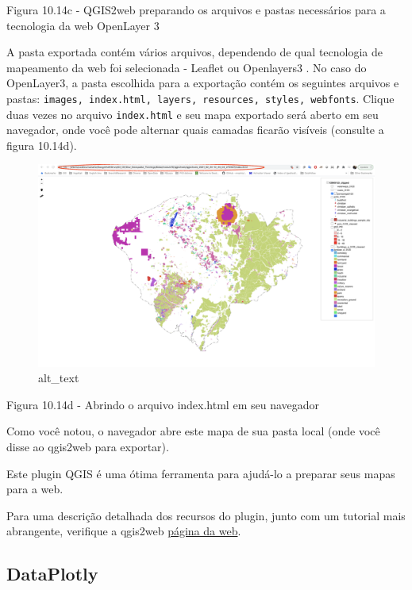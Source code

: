 \documentclass[
  portuguese,
]{krantz}
\begin{document}
Figura 10.14c - QGIS2web preparando os arquivos e pastas necessários para a tecnologia da web OpenLayer 3

A pasta exportada contém vários arquivos, dependendo de qual tecnologia de mapeamento da web foi selecionada - Leaflet ou Openlayers3 . No caso do OpenLayer3, a pasta escolhida para a exportação contém os seguintes arquivos e pastas: \texttt{images,\ index.html,\ layers,\ resources,\ styles,\ webfonts}. Clique duas vezes no arquivo \texttt{index.html} e seu mapa exportado será aberto em seu navegador, onde você pode alternar quais camadas ficarão visíveis (consulte a figura 10.14d).

\begin{figure}
\centering
\includegraphics{media/modulo10/fig1014_d.png}
\caption{alt\_text}
\end{figure}

Figura 10.14d - Abrindo o arquivo index.html em seu navegador

Como você notou, o navegador abre este mapa de sua pasta local (onde você disse ao qgis2web para exportar).

Este plugin QGIS é uma ótima ferramenta para ajudá-lo a preparar seus mapas para a web.

Para uma descrição detalhada dos recursos do plugin, junto com um tutorial mais abrangente, verifique a qgis2web \href{https://github.com/tomchadwin/qgis2web}{página da web}.

\hypertarget{dataplotly}{%
\subsection{\texorpdfstring{\textbf{DataPlotly}}{DataPlotly}}\label{dataplotly}}
\end{document}
